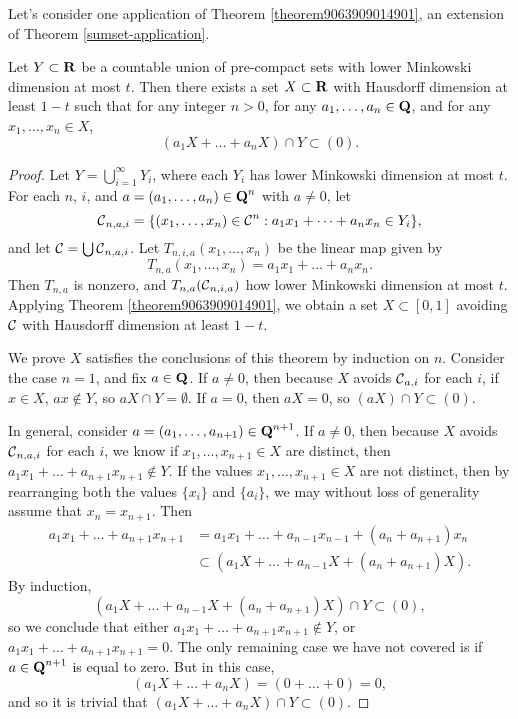 Let's consider one application of Theorem \ref{theorem9063909014901}, an extension of Theorem \ref{sumset-application}.

\begin{theorem}
    Let $Y \subset \operatorname{\mathbf{R}}$ be a countable union of pre-compact sets with lower Minkowski dimension at most $t$. Then there exists a set $X \subset \operatorname{\mathbf{R}}$ with Hausdorff dimension at least $1 - t$ such that for any integer $n > 0$, for any $a_1, \dots, a_n \in \operatorname{\mathbf{Q}}$, and for any $x_1, \dots, x_n \in X$,
    \[ (a_1X + \dots + a_n X) \cap Y \subset (0). \]
\end{theorem}
\begin{proof}
    Let $Y = \bigcup_{i = 1}^\infty Y_i$, where each $Y_i$ has lower Minkowski dimension at most $t$. For each $n$, $i$, and $a = (a_1, \dots, a_n) \in \operatorname{\mathbf{Q}}^n$ with $a \neq 0$, let
    \[ \operatorname{\mathcal{C}}_{n,a,i} = \{ (x_1, \dots, x_n) \in \operatorname{\mathcal{C}}^n : a_1x_1 + \dots + a_nx_n \in Y_i \}, \]
    and let $\operatorname{\mathcal{C}} = \bigcup \operatorname{\mathcal{C}}_{n,a,i}$. Let $T_{n,i,a}(x_1,\dots,x_n)$ be the linear map given by
    \[ T_{n,a}(x_1,\dots,x_n) = a_1x_1 + \dots + a_nx_n. \]
    Then $T_{n,a}$ is nonzero, and $T_{n,a}(\operatorname{\mathcal{C}}_{n,i,a})$ how lower Minkowski dimension at most $t$. Applying Theorem \ref{theorem9063909014901}, we obtain a set $X \subset [0,1]$ avoiding $\operatorname{\mathcal{C}}$ with Hausdorff dimension at least $1 - t$.

    We prove $X$ satisfies the conclusions of this theorem by induction on $n$. Consider the case $n = 1$, and fix $a \in \operatorname{\mathbf{Q}}$. If $a \neq 0$, then because $X$ avoids $\operatorname{\mathcal{C}}_{a,i}$ for each $i$, if $x \in X$, $ax \not \in Y$, so $aX \cap Y = \emptyset$. If $a = 0$, then $aX = 0$, so $(aX) \cap Y \subset (0)$.

    In general, consider $a = (a_1, \dots, a_{n+1}) \in \operatorname{\mathbf{Q}}^{n+1}$. If $a \neq 0$, then because $X$ avoids $\operatorname{\mathcal{C}}_{n,a,i}$ for each $i$, we know if $x_1, \dots, x_{n+1} \in X$ are distinct, then $a_1 x_1 + \dots + a_{n+1} x_{n+1} \not \in Y$. If the values $x_1, \dots, x_{n+1} \in X$ are not distinct, then by rearranging both the values $\{ x_i \}$ and $\{ a_i \}$, we may without loss of generality assume that $x_n = x_{n+1}$. Then
    \begin{align*}
        a_1 x_1 + \dots + a_{n+1} x_{n+1} &= a_1 x_1 + \dots + a_{n-1} x_{n-1} + (a_n + a_{n+1}) x_n\\
        &\subset (a_1 X + \dots + a_{n-1} X + (a_n + a_{n+1}) X).
    \end{align*}
    By induction,
    \[ (a_1 X + \dots + a_{n-1} X + (a_n + a_{n+1}) X) \cap Y \subset (0), \]
    so we conclude that either $a_1 x_1 + \dots + a_{n+1} x_{n+1} \not \in Y$, or $a_1x_1 + \dots + a_{n+1} x_{n+1} = 0$. The only remaining case we have not covered is if $a \in \operatorname{\mathbf{Q}}^{n+1}$ is equal to zero. But in this case,
    \[ (a_1 X + \dots + a_n X) = (0 + \dots + 0) = 0, \]
    and so it is trivial that $(a_1 X + \dots + a_n X) \cap Y \subset (0)$.
\end{proof}

